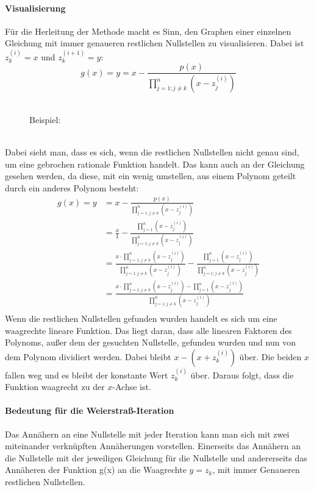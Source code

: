 \documentclass[12pt]{article}
\begin{document}
\paragraph{Visualisierung}
Für die Herleitung der Methode macht es Sinn, den Graphen einer einzelnen Gleichung mit immer genaueren restlichen Nullstellen zu visualisieren. Dabei ist $z_k^{(i)} = x$ und $z_k^{(i+1)} = y$:
\begin{equation}
    g(x) = y = x - \frac{p(x)}{\prod_{j=1;j\neq k}^{n} (x-z_j^{(i)})}
\end{equation}\\
\begin{figure}[h]
    \centering
    \caption{Beispiel:}
\end{figure}\\
Dabei sieht man, dass es sich, wenn die restlichen Nullstellen nicht genau sind, um eine gebrochen rationale Funktion handelt. Das kann auch an der Gleichung gesehen werden, da diese, mit ein wenig umstellen, aus einem Polynom geteilt durch ein anderes Polynom besteht:
\begin{align*}
    g(x) = y &= x - \frac{p(x)}{\prod_{j=1;j\neq k}^{n} (x-z_j^{(i)})} \\
    &= \frac{x}{1} - \frac{\prod_{j=1}^{n} (x-z_j^{(i)})}{\prod_{j=1;j\neq k}^{n} (x-z_j^{(i)})} \\
    &= \frac{x \cdot \prod_{j=1;j\neq k}^{n} (x-z_j^{(i)})}{\prod_{j=1;j\neq k}^{n} (x-z_j^{(i)})} - \frac{\prod_{j=1}^{n} (x-z_j^{(i)})}{\prod_{j=1;j\neq k}^{n} (x-z_j^{(i)})} \\
    &= \frac{x \cdot \prod_{j=1;j\neq k}^{n} (x-z_j^{(i)}) - \prod_{j=1}^{n} (x-z_j^{(i)})}{\prod_{j=1;j\neq k}^{n} (x-z_j^{(i)})} \\
\end{align*}
Wenn die restlichen Nullstellen gefunden wurden handelt es sich um eine waagrechte lineare Funktion. Das liegt daran, dass alle linearen Faktoren des Polynoms, außer dem der gesuchten Nullstelle, gefunden wurden und nun von dem Polynom dividiert werden. Dabei bleibt $x-(x+z_k^{(i)})$ über. Die beiden $x$ fallen weg und es bleibt der konstante Wert $z_k^{(i)}$ über. Daraus folgt, dass die Funktion waagrecht zu der $x$-Achse ist.
\paragraph{Bedeutung für die Weierstraß-Iteration}
Das Annähern an eine Nullstelle mit jeder Iteration kann man sich mit zwei miteinander verknüpften Annäherungen vorstellen. Einerseits das Annähern an die Nullstelle mit der jeweiligen Gleichung für die Nullstelle und andererseits das Annäheren der Funktion g(x) an die Waagrechte $y=z_k$, mit immer Genaueren restlichen Nullstellen.
\end{document}
